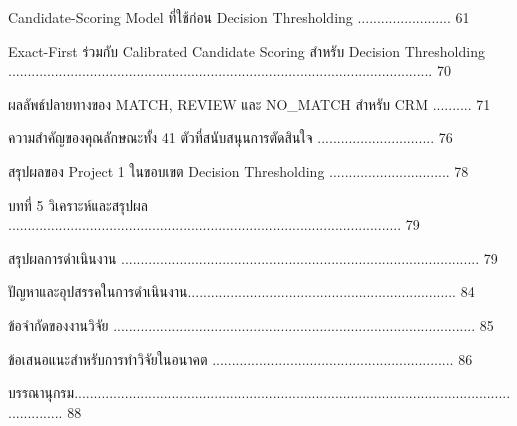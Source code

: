 \documentclass[12pt,a4paper]{report}
\begin{document}
 Candidate-Scoring Model ที่ใช้ก่อน Decision Thresholding ........................ 61\par
{} Exact-First ร่วมกับ Calibrated Candidate Scoring สำหรับ Decision Thresholding ............................................................................................................. 70\par
{} ผลลัพธ์ปลายทางของ MATCH, REVIEW และ NO\_MATCH สำหรับ CRM .......... 71\par
{} ความสำคัญของคุณลักษณะทั้ง 41 ตัวที่สนับสนุนการตัดสินใจ .............................. 76\par
{} สรุปผลของ Project 1 ในขอบเขต Decision Thresholding ............................... 78\par
บทที่ 5 วิเคราะห์และสรุปผล ..................................................................................................... 79\par
{} สรุปผลการดำเนินงาน ............................................................................................ 79\par
{} ปัญหาและอุปสรรคในการดำเนินงาน..................................................................... 84\par
{} ข้อจำกัดของงานวิจัย ............................................................................................. 85\par
{} ข้อเสนอแนะสำหรับการทำวิจัยในอนาคต .............................................................. 86\par
บรรณานุกรม.............................................................................................................................. 88\par
\clearpage
\end{document}
